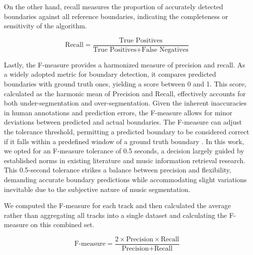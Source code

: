 On the other hand, recall measures the proportion of accurately detected boundaries against all reference boundaries, indicating the completeness or sensitivity of the algorithm.

\begin{equation}
\text{Recall} = \frac{\text{True Positives}}{\text{True Positives} + \text{False Negatives}}
\end{equation}

Lastly, the F-measure provides a harmonized measure of precision and recall. As a widely adopted metric for boundary detection, it compares predicted boundaries with ground truth ones, yielding a score between 0 and 1. This score, calculated as the harmonic mean of Precision and Recall, effectively accounts for both under-segmentation and over-segmentation. Given the inherent inaccuracies in human annotations and prediction errors, the F-measure allows for minor deviations between predicted and actual boundaries. The F-measure can adjust the tolerance threshold, permitting a predicted boundary to be considered correct if it falls within a predefined window of a ground truth boundary \cite{NietoPerceptualMusic, Turnbull2007ABOOSTING}. In this work, we opted for an F-measure tolerance of 0.5 seconds, a decision largely guided by established norms in existing literature and music information retrieval research. This 0.5-second tolerance strikes a balance between precision and flexibility, demanding accurate boundary predictions while accommodating slight variations inevitable due to the subjective nature of music segmentation.

We computed the F-measure for each track and then calculated the average rather than aggregating all tracks into a single dataset and calculating the F-measure on this combined set.

\begin{equation}
\text{F-measure} = \frac{2 \times \text{Precision} \times \text{Recall}}{\text{Precision} + \text{Recall}}
\end{equation}

\newpage